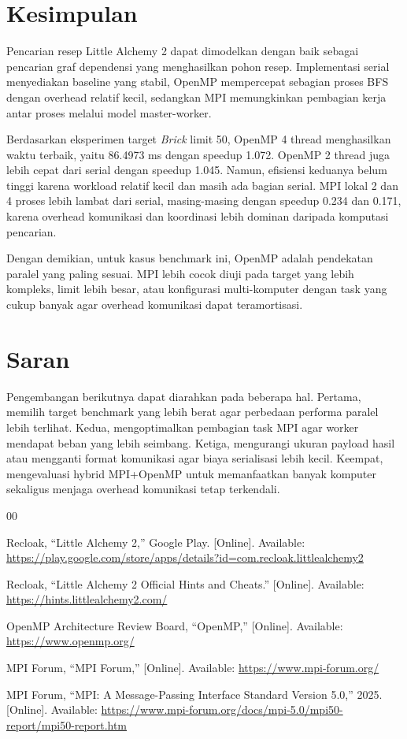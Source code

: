 \documentclass[conference]{IEEEtran}
\begin{document}
\section{Kesimpulan}

Pencarian resep Little Alchemy 2 dapat dimodelkan dengan baik sebagai pencarian graf dependensi yang menghasilkan pohon resep. Implementasi serial menyediakan baseline yang stabil, OpenMP mempercepat sebagian proses BFS dengan overhead relatif kecil, sedangkan MPI memungkinkan pembagian kerja antar proses melalui model master-worker.

Berdasarkan eksperimen target \textit{Brick} limit 50, OpenMP 4 thread menghasilkan waktu terbaik, yaitu 86.4973 ms dengan speedup 1.072. OpenMP 2 thread juga lebih cepat dari serial dengan speedup 1.045. Namun, efisiensi keduanya belum tinggi karena workload relatif kecil dan masih ada bagian serial. MPI lokal 2 dan 4 proses lebih lambat dari serial, masing-masing dengan speedup 0.234 dan 0.171, karena overhead komunikasi dan koordinasi lebih dominan daripada komputasi pencarian.

Dengan demikian, untuk kasus benchmark ini, OpenMP adalah pendekatan paralel yang paling sesuai. MPI lebih cocok diuji pada target yang lebih kompleks, limit lebih besar, atau konfigurasi multi-komputer dengan task yang cukup banyak agar overhead komunikasi dapat teramortisasi.

\section{Saran}

Pengembangan berikutnya dapat diarahkan pada beberapa hal. Pertama, memilih target benchmark yang lebih berat agar perbedaan performa paralel lebih terlihat. Kedua, mengoptimalkan pembagian task MPI agar worker mendapat beban yang lebih seimbang. Ketiga, mengurangi ukuran payload hasil atau mengganti format komunikasi agar biaya serialisasi lebih kecil. Keempat, mengevaluasi hybrid MPI+OpenMP untuk memanfaatkan banyak komputer sekaligus menjaga overhead komunikasi tetap terkendali.

\begin{thebibliography}{00}

Recloak, ``Little Alchemy 2,'' Google Play. [Online]. Available: \url{https://play.google.com/store/apps/details?id=com.recloak.littlealchemy2}

Recloak, ``Little Alchemy 2 Official Hints and Cheats.'' [Online]. Available: \url{https://hints.littlealchemy2.com/}

OpenMP Architecture Review Board, ``OpenMP,'' [Online]. Available: \url{https://www.openmp.org/}

MPI Forum, ``MPI Forum,'' [Online]. Available: \url{https://www.mpi-forum.org/}

MPI Forum, ``MPI: A Message-Passing Interface Standard Version 5.0,'' 2025. [Online]. Available: \url{https://www.mpi-forum.org/docs/mpi-5.0/mpi50-report/mpi50-report.htm}

\end{thebibliography}
\end{document}
